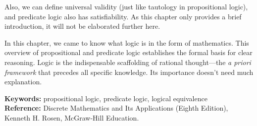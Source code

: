 Also, we can define universal validity (just like tautology in propositional logic), and predicate logic also has satisfiability. As this chapter only provides a brief introduction, it will not be elaborated further here.

In this chapter, we came to know what logic is in the form of mathematics. This overview of propositional and predicate logic establishes the formal basis for clear reasoning. Logic is the indispensable scaffolding of rational thought—the \emph{a priori framework} that precedes all specific knowledge. Its importance doesn't need much explanation.

\vspace{1cm}
\noindent
\textbf{Keywords:} propositional logic, predicate logic, logical equivalence \\
\textbf{Reference:} Discrete Mathematics and Its Applications (Eighth Edition), Kenneth H. Rosen, McGraw-Hill Education.

\cleardoublepage